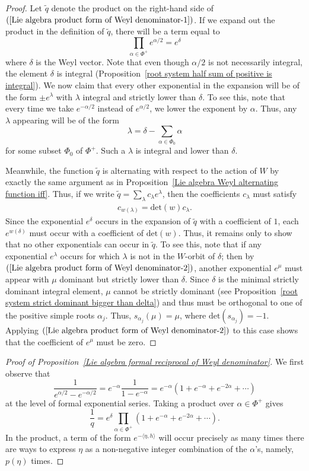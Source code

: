 \begin{proof}
Let $\tilde{q}$ denote the product on the right-hand side of $(\ref{Lie algebra product form of Weyl denominator-1})$. If we expand out the product in the definition of $\tilde{q}$, there will be a term equal to
\[\prod_{\alpha\in\Phi^+}e^{\alpha/2}=e^{\delta}\]
where $\delta$ is the Weyl vector. Note that even though $\alpha/2$ is not necessarily integral, the element $\delta$ is integral (Proposition~\ref{root system half sum of positive is integral}). We now claim that every other exponential in the expansion will be of the form $\pm e^{\lambda}$ with $\lambda$ integral and strictly lower than $\delta$. To see this, note that every time we take $e^{-\alpha/2}$ instead of $e^{\alpha/2}$, we lower the exponent by $\alpha$. Thus, any $\lambda$ appearing will be of the form
\[\lambda=\delta-\sum_{\alpha\in\Phi_0}\alpha\]
for some subset $\Phi_0$ of $\Phi^+$. Such a $\lambda$ is integral and lower than $\delta$.\par
Meanwhile, the function $\tilde{q}$ is alternating with respect to the action of $W$ by exactly the same argument as in Proposition~\ref{Lie algebra Weyl alternating function iff}. Thus, if we write $\tilde{q}=\sum_\lambda c_\lambda e^{\lambda}$, then the coefficients $c_\lambda$ must satisfy
\begin{align}\label{Lie algebra product form of Weyl denominator-2}
c_{w(\lambda)}=\mathrm{det}(w) c_\lambda.
\end{align}
Since the exponential $e^{\delta}$ occurs in the expansion of $\tilde{q}$ with a coefficient of $1$, each $e^{w(\delta)}$ must occur with a coefficient of $\mathrm{det}(w)$. Thus, it remains only
to show that no other exponentials can occur in $\tilde{q}$. To see this, note that if any exponential $e^{\lambda}$ occurs for which $\lambda$ is not in the $W$-orbit of $\delta$; then by $(\ref{Lie algebra product form of Weyl denominator-2})$, another exponential $e^{\mu}$ must appear with $\mu$ dominant but strictly lower than $\delta$. Since $\delta$ is the minimal strictly dominant integral element, $\mu$ cannot be strictly dominant (see Proposition~\ref{root system strict dominant bigger than delta}) and thus must be orthogonal to one of the positive simple roots $\alpha_j$. Thus, $s_{\alpha_j}(\mu)=\mu$, where $\mathrm{det}(s_{\alpha_j})=-1$. Applying $(\ref{Lie algebra product form of Weyl denominator-2})$ to this case shows that the coefficient of $e^{\mu}$ must be zero.
\end{proof}
\begin{proof}[Proof of Proposition~\ref{Lie algebra formal reciprocal of Weyl denominator}]
We first observe that
\[\frac{1}{e^{\alpha/2}-e^{-\alpha/2}}=e^{-\alpha}\frac{1}{1-e^{-\alpha}}=e^{-\alpha}(1+e^{-\alpha}+e^{-2\alpha}+\cdots)\]
at the level of formal exponential series. Taking a product over $\alpha\in\Phi^+$ gives
\[\frac{1}{q}=e^{\delta}\prod_{\alpha\in\Phi^+}(1+e^{-\alpha}+e^{-2\alpha}+\cdots).\]
In the product, a term of the form $e^{-\langle\eta,h\rangle}$ will occur precisely as many times there are ways to express $\eta$ as a non-negative integer combination of the $\alpha$'s, namely, $p(\eta)$ times.
\end{proof}
